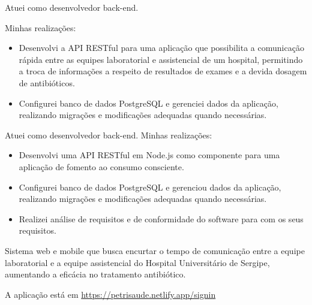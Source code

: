 \documentclass[10pt,a4paper,ragged2e,withhyper]{altacv}
\begin{document}
\begin{paracol}{2}
\par\divider
{}

Atuei como desenvolvedor back-end.

Minhas realizações:
\begin{itemize}
\item Desenvolvi a API RESTful para uma aplicação que possibilita a comunicação rápida entre as equipes laboratorial e assistencial de um hospital, permitindo a troca de informações a respeito de resultados de exames e a devida dosagem de antibióticos.
\item Configurei banco de dados PostgreSQL e gerenciei dados da aplicação, realizando migrações e modificações adequadas quando necessárias.
\end{itemize}


\newpage

\par\divider
{}

Atuei como desenvolvedor back-end. Minhas realizações:
\begin{itemize}
\item Desenvolvi uma API RESTful em Node.js como componente para uma aplicação de fomento ao consumo consciente.
\item Configurei banco de dados PostgreSQL e gerenciou dados da aplicação, realizando migrações e modificações adequadas quando necessárias.
\item Realizei análise de requisitos e de conformidade do software para com os seus requisitos.
\end{itemize}

\newpage
\switchcolumn
{}
\label{sec:org1aab6f3}

Sistema web e mobile que busca encurtar o tempo de comunicação entre a equipe laboratorial e a equipe assistencial do Hospital Universitário de Sergipe, aumentando a eficácia no tratamento antibiótico.

A aplicação está em \url{https://petrisaude.netlify.app/signin}


\end{paracol}
\end{document}
